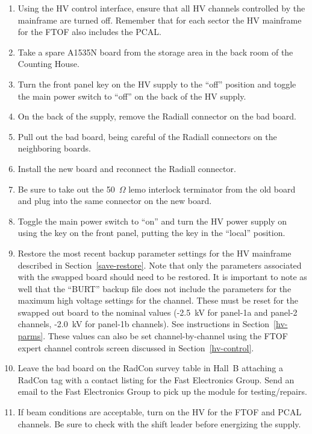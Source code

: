 \documentclass[12pt]{article}
\begin{document}
\begin{enumerate}
\item Using the HV control interface, ensure that all HV channels controlled by the
mainframe are turned off. Remember that for each sector the HV mainframe for the FTOF
also includes the PCAL.
\item Take a spare A1535N board from the storage area in the back room of the Counting
House.
\item Turn the front panel key on the HV supply to the ``off'' position and toggle 
the main power switch to ``off'' on the back of the HV supply.
\item On the back of the supply, remove the Radiall connector on the bad board.
\item Pull out the bad board, being careful of the Radiall connectors on the neighboring 
boards.
\item Install the new board and reconnect the Radiall connector.
\item Be sure to take out the 50~$\Omega$ lemo interlock terminator from the old board 
and plug into the same connector on the new board.
\item Toggle the main power switch to ``on'' and turn the HV power supply on using the 
key on the front panel, putting the key in the ``local'' position.
\item Restore the most recent backup parameter settings for the HV mainframe described
in Section~\ref{save-restore}. Note that only the parameters associated with the swapped
board should need to be restored. It is important to note as well that the ``BURT'' backup
file does not include the parameters for the maximum high voltage settings for the channel.
These must be reset for the swapped out board to the nominal values (-2.5~kV for panel-1a
and panel-2 channels, -2.0~kV for panel-1b channels). See instructions in Section~\ref{hv-parms}.
These values can also be set channel-by-channel using the FTOF expert channel controls
screen discussed in Section~\ref{hv-control}.
\item Leave the bad board on the RadCon survey table in Hall~B attaching a RadCon tag with a
contact listing for the Fast Electronics Group. Send an email to the Fast Electronics Group
to pick up the module for testing/repairs.
\item If beam conditions are acceptable, turn on the HV for the FTOF and PCAL channels. 
Be sure to check with the shift leader before energizing the supply.
\end{enumerate}
\end{document}

